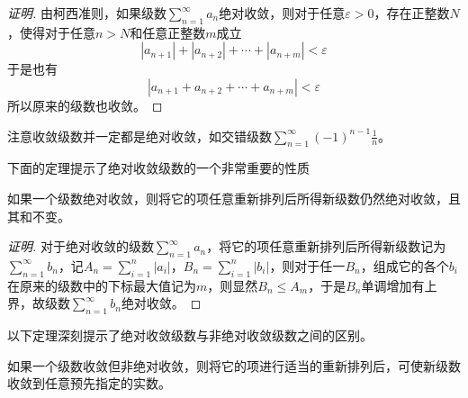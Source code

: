 \begin{proof}[证明]
  由柯西准则，如果级数$\sum_{n=1}^{\infty}a_{n}$绝对收敛，则对于任意$\varepsilon>0$，存在正整数$N$，使得对于任意$n>N$和任意正整数$m$成立
  \[ |a_{n+1}|+|a_{n+2}|+\cdots+|a_{n+m}| < \varepsilon \]
  于是也有
  \[ |a_{n+1}+a_{n+2}+\cdots+a_{n+m}| < \varepsilon \]
  所以原来的级数也收敛。
\end{proof}

注意收敛级数并一定都是绝对收敛，如交错级数$\sum_{n=1}^{\infty}(-1)^{n-1}\frac{1}{n}$。

下面的定理提示了绝对收敛级数的一个非常重要的性质
\begin{theorem}
  如果一个级数绝对收敛，则将它的项任意重新排列后所得新级数仍然绝对收敛，且其和不变。
\end{theorem}

\begin{proof}[证明]
  对于绝对收敛的级数$\sum_{n=1}^{\infty}a_n$，将它的项任意重新排列后所得新级数记为$\sum_{n=1}^{\infty}b_n$，记$A_n=\sum_{i=1}^n|a_i|$，$B_n=\sum_{i=1}^n|b_i|$，则对于任一$B_n$，组成它的各个$b_i$在原来的级数中的下标最大值记为$m$，则显然$B_n \leqslant A_m$，于是$B_n$单调增加有上界，故级数$\sum_{n=1}^{\infty}b_n$绝对收敛。
\end{proof}

以下定理深刻提示了绝对收敛级数与非绝对收敛级数之间的区别。
\begin{theorem}[黎曼定理]
  如果一个级数收敛但非绝对收敛，则将它的项进行适当的重新排列后，可使新级数收敛到任意预先指定的实数。
\end{theorem}

